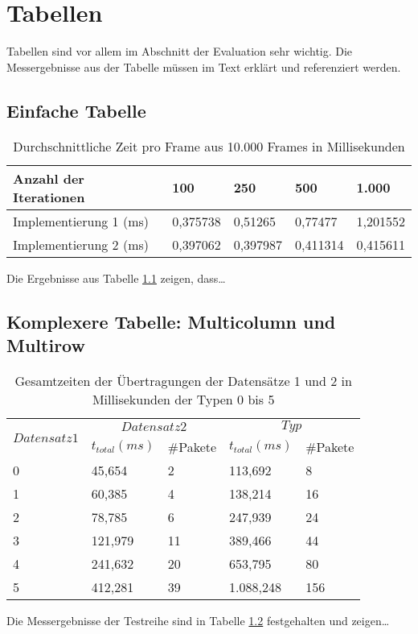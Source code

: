\chapter{Tabellen}

Tabellen sind vor allem im Abschnitt der Evaluation sehr wichtig. Die Messergebnisse aus der Tabelle müssen im Text erklärt und referenziert werden.

\section{Einfache Tabelle}
\begin{table}[H]
\begin{center}
    \begin{tabular}{| l | l | l | l | l |}
    \hline
    Anzahl der Iterationen & 100 & 250 & 500 & 1.000 \\ \hline
    Implementierung 1 (ms) & 0,375738 & 0,51265 & 0,77477 & 1,201552 \\ \hline
    Implementierung 2 (ms) & 0,397062 & 0,397987 & 0,411314 & 0,415611 \\ \hline
    \end{tabular}
\end{center}
\caption{Durchschnittliche Zeit pro Frame aus 10.000 Frames in Millisekunden}
\label{tabelle_avarage_time}
\end{table}

Die Ergebnisse aus Tabelle \ref{tabelle_avarage_time} zeigen, dass\ldots\\

\section{Komplexere Tabelle: Multicolumn und Multirow}

\begin{table}[H]
\begin{center}
    \begin{tabular}{| l | l | l | l | l |}
    \hline
    \multirow{2}{*}{$Datensatz 1$} & \multicolumn{2}{|c|}{$Datensatz 2$}  &
    \multicolumn{2}{|c|}{$Typ$} \\
    \cline{2-5}
    & $t_{total}(ms)$ & \#Pakete & $t_{total}(ms)$ & \#Pakete \\    		
    \hline 
    0 & 45,654 & 2 & 113,692 & 8 \\ \hline
    1 & 60,385 & 4 & 138,214 & 16 \\ \hline
    2 & 78,785 & 6 & 247,939 & 24 \\ \hline
    3 & 121,979 & 11 & 389,466 & 44 \\ \hline
    4 & 241,632 & 20 & 653,795 & 80 \\ \hline
    5 & 412,281 & 39 & 1.088,248 & 156 \\ \hline
    \end{tabular}
\end{center}
\caption{Gesamtzeiten der Übertragungen der Datensätze 1 und 2 in
Millisekunden der Typen 0 bis 5}
\label{tabelle_uebertragung}
\end{table}

Die Messergebnisse der Testreihe sind in Tabelle \ref{tabelle_uebertragung} festgehalten und zeigen\ldots


